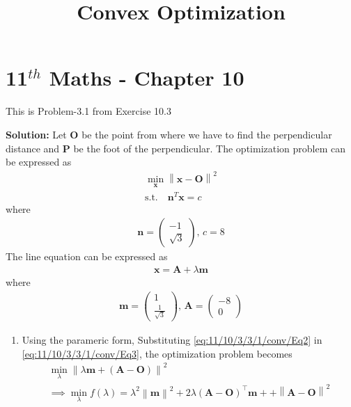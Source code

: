 \documentclass[12pt]{article}
\providecommand{\brak}[1]{\ensuremath{\left(#1\right)}}
\providecommand{\norm}[1]{\left\lVert#1\right\rVert}
\newcommand{\solution}{\noindent \textbf{Solution: }}
\newcommand{\myvec}[1]{\ensuremath{\begin{pmatrix}#1\end{pmatrix}}}
\let\vec\mathbf
\begin{document}
\begin{center}
\title{\textbf{Convex Optimization}}
\date{\vspace{-5ex}} %
\maketitle
\end{center}
\setcounter{page}{1}

\section{11$^{th}$ Maths - Chapter 10}
This is Problem-3.1 from Exercise 10.3 
\begin{enumerate}

\solution 
\fi
Let $\vec{O}$ be the point from where we have to find the perpendicular distance and $\vec{P}$ be the foot of the perpendicular. The optimization problem can be expressed as
\begin{align}
	\label{eq:11/10/3/3/1/conv/Eq3}
	  \min_{\vec{x}} \norm{\vec{x}-\vec{O}}^2\\
	 \text{s.t.} \quad \vec{n}^T\vec{x} = c 
\end{align}
where 
\begin{align}
	\vec{n} = \myvec{-1 \\ \sqrt{3}},\,c = 8
\end{align}
The line equation can be expressed as
\begin{align}
	\label{eq:11/10/3/3/1/conv/Eq2}
	\vec{x} = \vec{A}+\lambda\vec{m}
\end{align}
where
\begin{align}
	\label{eq:11/10/3/3/1/conv/Eq1}
	\vec{m} = \myvec{1 \\ \frac{1}{\sqrt{3}}},\,
	\vec{A} = \myvec{-8 \\ 0}
\end{align}
\begin{enumerate}
\item Using the parameric form,
Substituting \eqref{eq:11/10/3/3/1/conv/Eq2} in \eqref{eq:11/10/3/3/1/conv/Eq3}, the optimization problem becomes
\begin{align}
	\min_{\lambda} \norm{ \lambda\vec{m} +\brak{\vec{A}-\vec{O}}}^2\\
	\implies \min_{\lambda}f\brak{\lambda} 	
	= \lambda^2\norm{\vec{m}}^2+ 2\lambda\brak{\vec{A}-\vec{O}}^\top\vec{m}+ + \norm{\vec{A}-\vec{O}}^2  
\label{eq:11/10/3/3/1/conv/Eq4}
\end{align}

\end{enumerate}
\end{enumerate}
\end{document}
